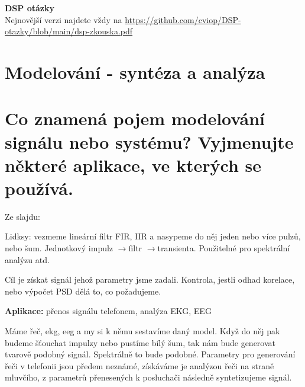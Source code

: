\documentclass[a4paper,12pt]{article}   %
\newcommand{\rrarr}{$\rightarrow$}
\newcommand{\okruh}[1]{\section*{\Large #1}}
\begin{document}
\pagestyle{fancy}                                           %
\renewcommand{\headrulewidth}{0.5pt}                        %
\renewcommand{\footrulewidth}{0pt}                          %
\lhead{}        \rhead{}  %
\lfoot{ } \cfoot{ } \rfoot{ }                                  %

\begin{center}
    {\Large \textbf{DSP otázky}}\\
    {\normalfont Nejnovější verzi najdete vždy na \url{https://github.com/cviop/DSP-otazky/blob/main/dsp-zkouska.pdf}}\\
\end{center}





\tableofcontents
\newpage
{} %
\okruh{Modelování - syntéza a analýza}
\section{Co znamená pojem modelování signálu nebo systému? Vyjmenujte některé aplikace, ve kterých se používá.}
Ze slajdu: 


Lidksy: vezmeme lineární filtr FIR, IIR a nasypeme do něj jeden nebo více pulzů, nebo šum. Jednotkový impulz \rrarr filtr \rrarr transienta. Použitelné pro spektrální analýzu atd. 

Cíl je získat signál jehož parametry jsme zadali. Kontrola, jestli odhad korelace, nebo výpočet PSD dělá to, co požadujeme.

\textbf{Aplikace:} přenos signálu telefonem, analýza EKG, EEG

Máme řeč, ekg, eeg a my si k němu sestavíme daný model. Když do něj pak budeme šťouchat impulzy nebo pustíme bílý šum, tak nám bude generovat tvarově podobný signál. Spektrálně to bude podobné. Parametry pro generování řeči v telefonii jsou předem neznámé, získáváme je analýzou řeči na straně mluvčího, z parametrů přenesených k posluchači následně syntetizujeme signál. 
\end{document}
